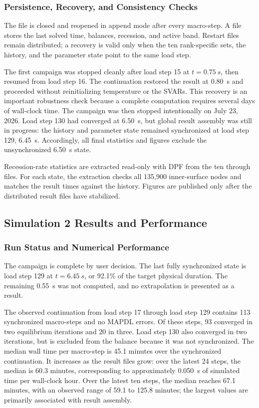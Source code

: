 \documentclass[oneside,openany]{amsdtx}
\providecommand{\codepath}[1]{\path{#1}}
\begin{document}
\subsubsection{Persistence, Recovery, and Consistency Checks}

The \codepath{simulation2_history.csv} file is closed and reopened in append mode
after every macro-step. A \codepath{simulation2_state.parm} file stores the last
solved time, balances, recession, and active band. Restart files remain
distributed; a recovery is valid only when the ten rank-specific sets, the
history, and the parameter state point to the same load step.

The first campaign was stopped cleanly after load step 15 at
\(t=\SI{0.75}{s}\), then resumed from load step 16. The continuation restored
the result at \SI{0.80}{s} and proceeded without reinitializing temperature or
the SVARs. This recovery is an important robustness check because a complete
computation requires several days of wall-clock time. The campaign was then
stopped intentionally on July 23, 2026. Load step 130 had converged at
\SI{6.50}{s}, but global result assembly was still in progress: the history
and parameter state remained synchronized at load step 129, \SI{6.45}{s}.
Accordingly, all final statistics and figures exclude the unsynchronized
\SI{6.50}{s} state.

Recession-rate statistics are extracted read-only with DPF from the ten
 through  files. For each state, the extraction
checks all 135,900 inner-surface nodes and matches the result times against the
history. Figures are published only after the distributed result files have
stabilized.

\subsection{Simulation 2 Results and Performance}

\subsubsection{Run Status and Numerical Performance}

The campaign is complete by user decision. The last fully synchronized state
is load step 129 at \(t=\SI{6.45}{s}\), or 92.1\% of the target physical
duration. The remaining \SI{0.55}{s} was not computed, and no extrapolation is
presented as a result.

The observed continuation from load step 17 through load step 129 contains 113
synchronized macro-steps and no MAPDL errors. Of these steps, 93 converged in
two equilibrium iterations and 20 in three. Load step 130 also converged in two
iterations, but is excluded from the balance because it was not synchronized.
The median wall time per macro-step is 45.1 minutes over the synchronized
continuation. It increases as the result files grow: over the latest 24 steps,
the median is 60.3 minutes, corresponding to approximately
\SI{0.050}{s} of simulated time per wall-clock hour. Over the latest ten steps,
the median reaches 67.1 minutes, with an observed range of 59.1 to 125.8
minutes; the largest values are primarily associated with result assembly.
\end{document}
